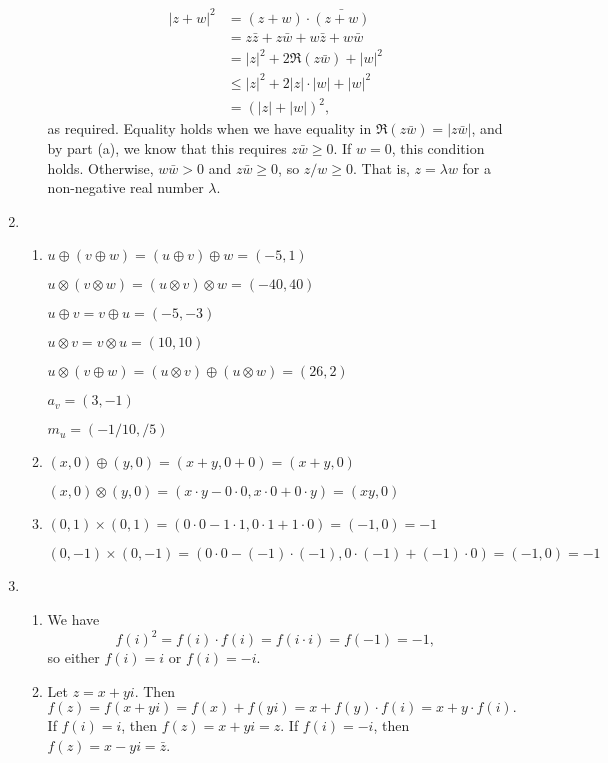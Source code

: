 \begin{enumerate}
\begin{enumerate}
\begin{align*}
\lvert z + w\rvert^2 &= (z + w)\cdot\bar{(z + w)} \\
&= z\bar{z} + z\bar{w} + w\bar{z} + w\bar{w} \\
&= \lvert z\rvert^2 + 2\Re(z\bar{w}) + \lvert w\rvert^2 \\
&\leq\lvert z\rvert^2 + 2\lvert z\rvert\cdot\lvert w\rvert + \lvert w\rvert^2 \\
&= (\lvert z\rvert + \lvert w\rvert)^2,
\end{align*}
as required. Equality holds when we have equality in $\Re (z\bar{w}) = \lvert z\bar{w}\rvert$, and by part (a), we know that this requires $z\bar{w}\geq 0$. If $w = 0$, this condition holds. Otherwise, $w\bar{w} > 0$ and $z\bar{w}\geq 0$, so $z/w\geq 0$. That is, $z = \lambda w$ for a non-negative real number $\lambda$.
\end{enumerate}
\item \begin{enumerate}
\item $u\oplus (v\oplus w) = (u\oplus v)\oplus w = (-5,1)$\par
$u\otimes (v\otimes w) = (u\otimes v)\otimes w = (-40,40)$\par
$u\oplus v = v\oplus u = (-5,-3)$\par
$u\otimes v = v\otimes u = (10,10)$\par
$u\otimes (v\oplus w) = (u\otimes v)\oplus (u\otimes w) = (26,2)$\par
$a_v = (3,-1)$\par
$m_u = (-1/10, /5)$
\item $(x,0)\oplus (y,0) = (x + y, 0 + 0) = (x + y, 0)$\par
$(x,0)\otimes (y,0) = (x\cdot y - 0\cdot 0, x\cdot 0 + 0\cdot y) = (xy,0)$
\item $(0,1)\times (0,1) = (0\cdot 0 - 1\cdot 1, 0\cdot 1 + 1\cdot 0) = (-1,0) = -1$\par
$(0,-1)\times (0,-1) = (0\cdot 0 - (-1)\cdot (-1), 0\cdot (-1) + (-1)\cdot 0) = (-1,0) = -1$
\end{enumerate}
\item \begin{enumerate}
\item We have
\begin{equation*}
f(i)^2 = f(i)\cdot f(i) = f(i\cdot i) = f(-1) = -1,
\end{equation*}
so either $f(i) = i$ or $f(i) = -i$.
\item Let $z = x + yi$. Then
\begin{equation*}
f(z) = f(x + yi) = f(x) + f(yi) = x + f(y)\cdot f(i) = x + y\cdot f(i).
\end{equation*}
If $f(i) = i$, then $f(z) = x + yi = z$. If $f(i) = -i$, then $f(z) = x - yi = \bar{z}$.
\end{enumerate}
\end{enumerate}